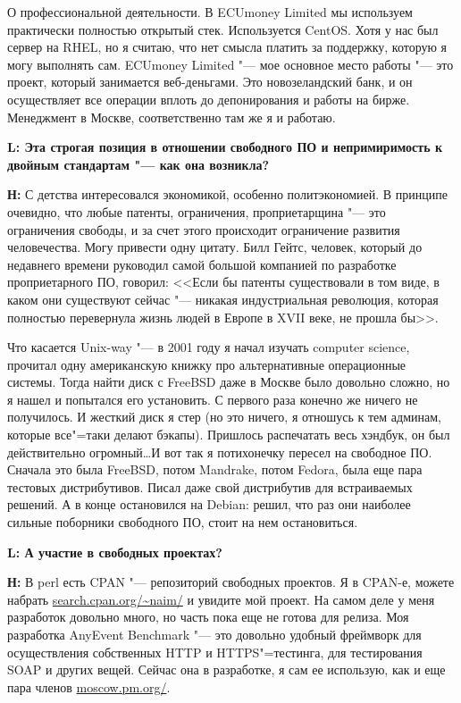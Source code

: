 \documentclass[10pt, a5paper]{article}
\begin{document}
О профессиональной деятельности. В ECUmoney Limited мы используем практически полностью открытый стек. Используется CentOS. Хотя у нас был сервер на RHEL, но я считаю, что нет смысла платить за поддержку, которую я могу выполнять сам. ECUmoney Limited "--- мое основное место работы "--- это проект, который занимается веб-деньгами. Это новозеландский банк, и он осуществляет все операции вплоть до депонирования и работы на бирже. Менеджмент в Москве, соответственно там же я и работаю. 

{\noindent \bf L: Эта строгая позиция в отношении свободного ПО и непримиримость к двойным стандартам "--- как она возникла?}

{\noindent \bf Н:} С детства интересовался экономикой, особенно политэкономией. В принципе очевидно, что любые патенты, ограничения, проприетарщина "--- это ограничения свободы, и за счет этого происходит ограничение развития человечества. Могу привести одну цитату. Билл Гейтс, человек, который до недавнего времени руководил самой большой компанией по разработке проприетарного ПО, говорил: <<Если бы патенты существовали в том виде, в каком они существуют сейчас "--- никакая индустриальная революция, которая полностью перевернула жизнь людей в Европе в XVII веке, не прошла бы>>.

Что касается Unix-way "--- в 2001 году я начал изучать computer science, прочитал одну американскую книжку про альтернативные операционные системы. Тогда найти диск с FreeBSD даже в Москве было довольно сложно, но я нашел и попытался его установить. С первого раза конечно же ничего не получилось.  И жесткий диск я стер (но это ничего, я отношусь к тем админам, которые все"=таки делают бэкапы). Пришлось распечатать весь хэндбук, он был действительно огромный\ldots  И вот так я потихонечку пересел на свободное ПО. Сначала это была FreeBSD, потом Mandrake, потом Fedora, была еще пара тестовых дистрибутивов. Писал даже свой дистрибутив для встраиваемых решений. А в конце остановился на Debian: решил, что раз они наиболее сильные поборники свободного ПО, стоит на нем остановиться.

{\noindent \bf L: А участие в свободных проектах?}

{\noindent \bf Н:} В perl есть CPAN "--- репозиторий свободных проектов. Я в CPAN-е, можете набрать \url{search.cpan.org/~naim/} и увидите мой проект. На самом деле у меня разработок довольно много, но часть пока еще не готова для релиза. Моя разработка AnyEvent Benchmark "--- это довольно удобный фреймворк для осуществления собственных HTTP и HTTPS"=тестинга, для тестирования SOAP и других вещей. Сейчас она в разработке, я сам ее использую, как и еще пара членов \url{moscow.pm.org/}.
\end{document}
